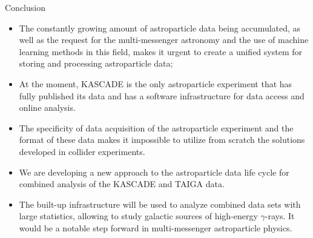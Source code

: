 \begin{frame}{Conclusion}
\small
\begin{itemize}
  \item The constantly growing amount of astroparticle data being accumulated, as well as the request for the multi-messenger astronomy and the use of machine learning methods in this field, makes it urgent to create a unified system for storing and processing astroparticle data;
  \item At the moment, KASCADE is the only astroparticle experiment that has fully published its data and has a software infrastructure for data access and online analysis.
  \item The specificity of data acquisition of the astroparticle experiment and the format of these data makes it impossible to utilize from scratch the solutions developed in collider experiments.
  \item We are developing a new approach to the astroparticle data life cycle for combined analysis of the KASCADE and TAIGA data.
  \item The built-up infrastructure will be used to analyze combined data sets with large statistics, allowing to study galactic sources of high-energy $\gamma$-rays.
  It would be a notable step forward in multi-messenger astroparticle physics.

\end{itemize}
\end{frame}

%
